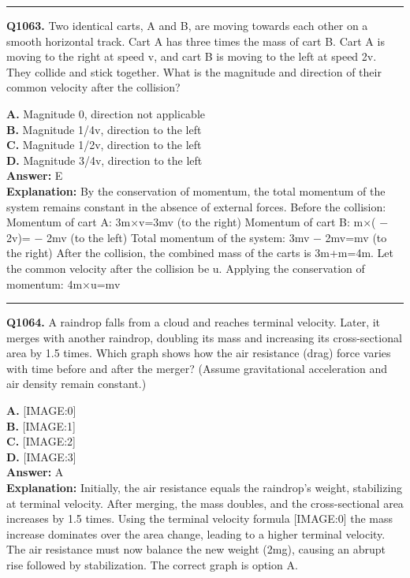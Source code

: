\documentclass[12pt]{article}
\begin{document}
\hrule
\vspace{1em}


\noindent
\textbf{Q1063.} Two identical carts, A and B, are moving towards each other on a smooth horizontal track. Cart A has three times the mass of cart B. Cart A is moving to the right at speed v, and cart B is moving to the left at speed 2v. They collide and stick together. What is the magnitude and direction of their common velocity after the collision?



\textbf{A.} Magnitude 0, direction not applicable \\
\textbf{B.} Magnitude 1/4v, direction to the left \\
\textbf{C.} Magnitude 1/2v, direction to the left \\
\textbf{D.} Magnitude 3/4v, direction to the left \\

\textbf{Answer:} E \\
\textbf{Explanation:} By the conservation of momentum, the total momentum of the system remains constant in the absence of external forces. Before the collision:
Momentum of cart A: 3m×v=3mv (to the right)
Momentum of cart B: m×(
−
2v)=
−
2mv (to the left)
Total momentum of the system: 3mv
−
2mv=mv (to the right)
After the collision, the combined mass of the carts is 3m+m=4m. Let the common velocity after the collision be u. Applying the conservation of momentum:
4m×u=mv

\hrule
\vspace{1em}


\noindent
\textbf{Q1064.} A raindrop falls from a cloud and reaches terminal velocity. Later, it merges with another raindrop, doubling its mass and increasing its cross-sectional area by 1.5 times. Which graph shows how the air resistance (drag) force varies with time before and after the merger? (Assume gravitational acceleration and air density remain constant.)



\textbf{A.} [IMAGE:0] \\
\textbf{B.} [IMAGE:1] \\
\textbf{C.} [IMAGE:2] \\
\textbf{D.} [IMAGE:3] \\

\textbf{Answer:} A \\
\textbf{Explanation:} Initially, the air resistance equals the raindrop’s weight, stabilizing at terminal velocity. After merging, the mass doubles, and the cross-sectional area increases by 1.5 times. Using the terminal velocity formula
[IMAGE:0]
the mass increase dominates over the area change, leading to a higher terminal velocity. The air resistance must now balance the new weight (2mg), causing an abrupt rise followed by stabilization. The correct graph is option A.
\end{document}
